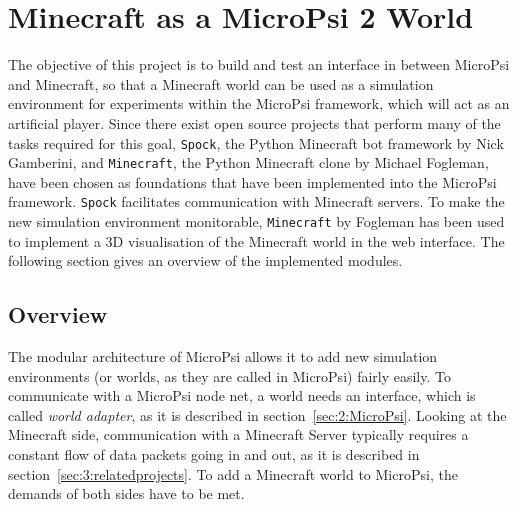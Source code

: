 \chapter{Minecraft as a MicroPsi 2 World}
\label{chap:4}
The objective of this project is to build and test an interface in between MicroPsi and Minecraft, so that a Minecraft world can be used as a simulation environment for experiments within the MicroPsi framework, which will act as an artificial player. Since there exist open source projects that perform many of the tasks required for this goal, \texttt{Spock}, the Python Minecraft bot framework by Nick Gamberini, and \texttt{Minecraft}, the Python Minecraft clone by Michael Fogleman, have been chosen as foundations that have been implemented into the MicroPsi framework. \texttt{Spock} facilitates communication with Minecraft servers. To make the new simulation environment monitorable, \texttt{Minecraft} by Fogleman has been used to implement a 3D visualisation of the Minecraft world in the web interface. The following section gives an overview of the implemented modules.

\section{Overview}



The modular architecture of MicroPsi allows it to add new simulation environments (or worlds, as they are called in MicroPsi) fairly easily. To communicate with a MicroPsi node net, a world needs an interface, which is called \emph{world adapter}, as it is described in section~\ref{sec:2:MicroPsi}. Looking at the Minecraft side, communication with a Minecraft Server typically requires a constant flow of data packets going in and out, as it is described in section~\ref{sec:3:relatedprojects}. To add a Minecraft world to MicroPsi, the demands of both sides have to be met.

